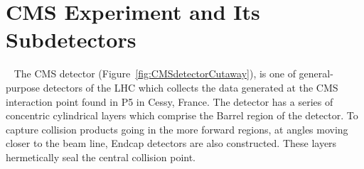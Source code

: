 




\section{CMS Experiment and Its Subdetectors}~\label{sec:CMSDetector}
The CMS detector (Figure~\ref{fig:CMSdetectorCutaway}), is one of general-purpose detectors of the LHC which collects the data generated at the CMS interaction point found in P5 in Cessy, France. The detector has a series of concentric cylindrical layers which comprise the Barrel region of the detector. To capture collision products going in the more forward regions, at angles moving closer to the beam line, Endcap detectors are also constructed. These layers hermetically seal the central collision point.

